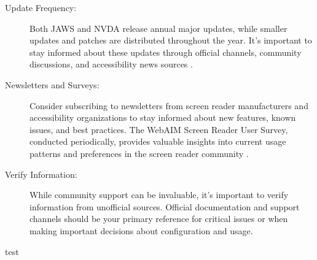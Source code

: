\begin{description}
	\item[Update Frequency:] Both JAWS and NVDA release annual major updates, while smaller updates and patches are distributed throughout the year. It's important to stay informed about these updates through official channels, community discussions, and accessibility news sources \cite{JAWSWhatsNew, turn0search9}.
	\item[Newsletters and Surveys:] Consider subscribing to newsletters from screen reader manufacturers and accessibility organizations to stay informed about new features, known issues, and best practices. The WebAIM Screen Reader User Survey, conducted periodically, provides valuable insights into current usage patterns and preferences in the screen reader community \cite{WebAIMSurvey}.
	\item[Verify Information:] While community support can be invaluable, it's important to verify information from unofficial sources. Official documentation and support channels should be your primary reference for critical issues or when making important decisions about  configuration and usage.
\end{description}
test

